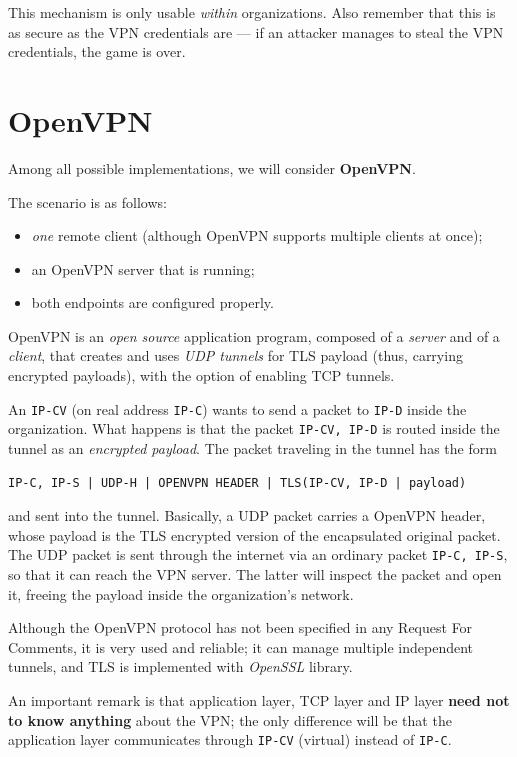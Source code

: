 \documentclass[10pt]{extreport}
\begin{document}
This mechanism is only usable \emph{within} organizations. Also remember that
this is as secure as the VPN credentials are --- if an attacker manages to steal
the VPN credentials, the game is over.

\section{OpenVPN}

Among all possible implementations, we will consider \textbf{OpenVPN}. 

The scenario is as follows:
\begin{itemize}
    \item \emph{one} remote client (although OpenVPN supports multiple clients
        at once);
    \item an OpenVPN server that is running;
    \item both endpoints are configured properly.
\end{itemize}

OpenVPN is an \emph{open source} application program, composed of a
\emph{server} and of a \emph{client}, that creates and uses \emph{UDP tunnels}
for TLS payload (thus, carrying encrypted payloads), with the option of
enabling TCP tunnels.

An \texttt{IP-CV} (on real address \texttt{IP-C}) wants to
send a packet to \texttt{IP-D} inside the organization. What happens is that
the packet \texttt{IP-CV, IP-D} is routed inside the tunnel as an
\emph{encrypted payload}. The packet traveling in the tunnel has the form

\begin{verbatim}
IP-C, IP-S | UDP-H | OPENVPN HEADER | TLS(IP-CV, IP-D | payload)
\end{verbatim}

and sent into the tunnel. Basically, a UDP packet carries a OpenVPN header,
whose payload is the TLS encrypted version of the encapsulated original packet.
The UDP packet is sent through the internet via an ordinary packet
\texttt{IP-C, IP-S}, so that it can reach the VPN server. The latter will
inspect the packet and open it, freeing the payload inside the organization's
network.

Although the OpenVPN protocol has not been specified in any Request For
Comments, it is very used and reliable; it can manage multiple independent
tunnels, and TLS is implemented with \emph{OpenSSL} library.

An important remark is that application layer, TCP layer and IP layer
\textbf{need not to know anything} about the VPN; the only difference will be
that the application layer communicates through \texttt{IP-CV} (virtual)
instead of \texttt{IP-C}.
\end{document}
